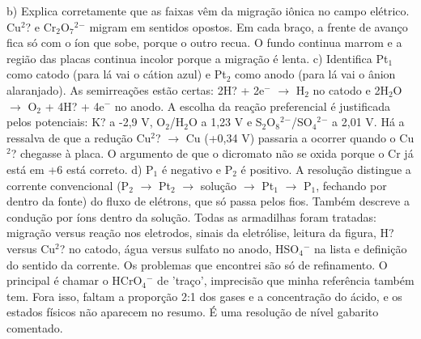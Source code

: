 \documentclass{article}%
\begin{document}
\newline%
b) Explica corretamente que as faixas vêm da migração iônica no campo elétrico. Cu$^2$? e Cr$_{2}$O$_{7}$$^2$$^{-}$ migram em sentidos opostos. Em cada braço, a frente de avanço fica só com o íon que sobe, porque o outro recua. O fundo continua marrom e a região das placas continua incolor porque a migração é lenta.\newline%
\newline%
c) Identifica Pt$_{1}$ como catodo (para lá vai o cátion azul) e Pt$_{2}$ como anodo (para lá vai o ânion alaranjado). As semirreações estão certas: 2H? + 2e$^{-}$ $\to$ H$_{2}$ no catodo e 2H$_{2}$O $\to$ O$_{2}$ + 4H? + 4e$^{-}$ no anodo. A escolha da reação preferencial é justificada pelos potenciais: K? a -2,9 V, O$_{2}$/H$_{2}$O a 1,23 V e S$_{2}$O$_{8}$$^2$$^{-}$/SO$_{4}$$^2$$^{-}$ a 2,01 V. Há a ressalva de que a redução Cu$^2$? $\to$ Cu (+0,34 V) passaria a ocorrer quando o Cu$^2$? chegasse à placa. O argumento de que o dicromato não se oxida porque o Cr já está em +6 está correto.\newline%
\newline%
d) P$_{1}$ é negativo e P$_{2}$ é positivo. A resolução distingue a corrente convencional (P$_{2}$ $\to$ Pt$_{2}$ $\to$ solução $\to$ Pt$_{1}$ $\to$ P$_{1}$, fechando por dentro da fonte) do fluxo de elétrons, que só passa pelos fios. Também descreve a condução por íons dentro da solução.\newline%
\newline%
Todas as armadilhas foram tratadas: migração versus reação nos eletrodos, sinais da eletrólise, leitura da figura, H? versus Cu$^2$? no catodo, água versus sulfato no anodo, HSO$_{4}$$^{-}$ na lista e definição do sentido da corrente. Os problemas que encontrei são só de refinamento. O principal é chamar o HCrO$_{4}$$^{-}$ de 'traço', imprecisão que minha referência também tem. Fora isso, faltam a proporção 2:1 dos gases e a concentração do ácido, e os estados físicos não aparecem no resumo. É uma resolução de nível gabarito comentado.%
\end{document}
